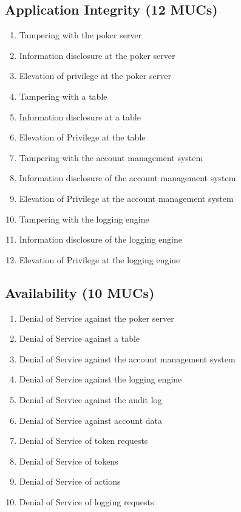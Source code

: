 \documentclass[a4paper,11pt]{report}
\begin{document}
\subsection{Application Integrity (12 MUCs)}
\label{ApplicationIntegrityMUCs}
\begin{enumerate}
\item Tampering with the poker server
\item Information disclosure at the poker server
\item Elevation of privilege at the poker server
\item Tampering with a table
\item Information disclosure at a table
\item Elevation of Privilege at the table
\item Tampering with the account management system
\item Information disclosure of the account management system
\item Elevation of Privilege at the account management system
\item Tampering with the logging engine
\item Information disclosure of the logging engine
\item Elevation of Privilege at the logging engine
\end{enumerate}

\subsection{Availability (10 MUCs)}
\begin{enumerate}
\item Denial of Service against the poker server
\item Denial of Service against a table
\item Denial of Service against the account management system
\item Denial of Service against the logging engine
\item Denial of Service against the audit log
\item Denial of Service against account data
\item Denial of Service of token requests
\item Denial of Service of tokens
\item Denial of Service of actions
\item Denial of Service of logging requests
\end{enumerate}
\end{document}
